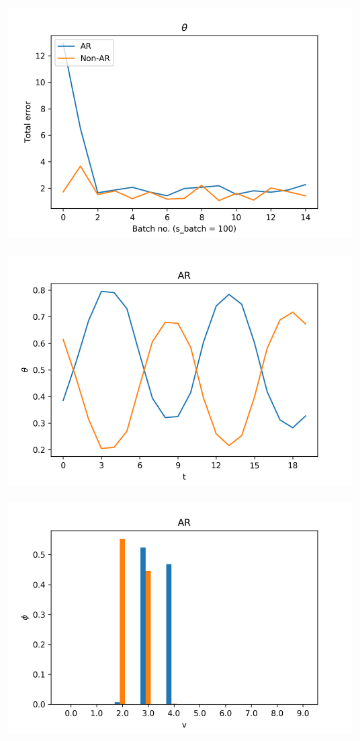\documentclass[12pt]{article}
\begin{document}
\begin{figure}[H]
\end{figure}

\begin{figure}[H]
  \centering
  \begin{subfigure}[b]{0.3\textwidth}
    \includegraphics[width=\linewidth]{performance_thetas_experiment-1|overlapping-yes_dataset-6.png}
  \end{subfigure}%
  \begin{subfigure}[b]{0.3\textwidth}
    \includegraphics[width=\linewidth]{latent_thetas_AR_experiment-1|overlapping-yes_dataset-6.png}
  \end{subfigure}%
  \begin{subfigure}[b]{0.3\textwidth}
    \includegraphics[width=\linewidth]{latent_phis_AR_experiment-1|overlapping-yes_dataset-6.png}

\end{subfigure}
\end{figure}
\end{document}
